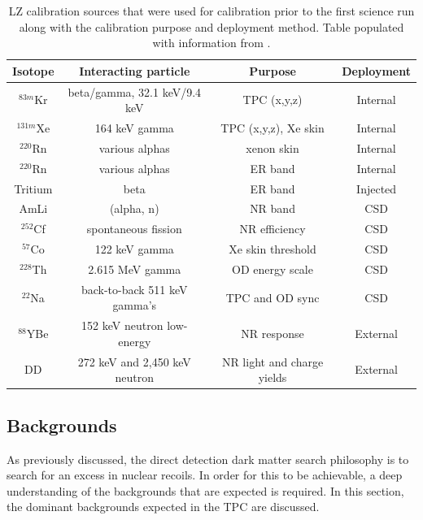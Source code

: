 \begin{table}
    \centering
    \begin{tabular}{c|c|c|c}
    \hline
    Isotope       & Interacting particle         & Purpose                    & Deployment \\
    \hline
    ${}^{83m}$Kr  & beta/gamma, 32.1 keV/9.4 keV & TPC (x,y,z)                & Internal  \\
    ${}^{131m}$Xe & 164 keV gamma                & TPC (x,y,z), Xe skin       & Internal  \\ 
    ${}^{220}$Rn  & various alphas               & xenon skin                 & Internal  \\
    ${}^{220}$Rn  & various alphas               & ER band                    & Internal  \\
    Tritium       & beta                         & ER band                    & Injected  \\
    AmLi          & (alpha, n)                   & NR band                    & CSD       \\
    ${}^{252}$Cf  & spontaneous fission          & NR efficiency              & CSD       \\
    ${}^{57}$Co   & 122 keV gamma                & Xe skin threshold          & CSD       \\
    ${}^{228}$Th  & 2.615 MeV gamma              & OD energy scale            & CSD       \\
    ${}^{22}$Na   & back-to-back 511 keV gamma’s & TPC and OD sync            & CSD       \\
    ${}^{88}$YBe  & 152 keV neutron low-energy   & NR response                & External  \\
    DD            & 272 keV and 2,450 keV neutron & NR light and charge yields & External 
    \end{tabular}
    \caption{LZ calibration sources that were used for calibration prior to the first science run along with the calibration purpose and deployment method. Table populated with information from \cite{LZ_TechnicalDesignReview_ref}.}
    \label{tab:LZ_Used_Calibration_Sources}
\end{table}


\subsection{Backgrounds}
\label{sec:lz_backgrounds}
\par
As previously discussed, the direct detection dark matter search philosophy is to search for an excess in nuclear recoils.
In order for this to be achievable, a deep understanding of the backgrounds that are expected is required.
In this section, the dominant backgrounds expected in the TPC are discussed.

